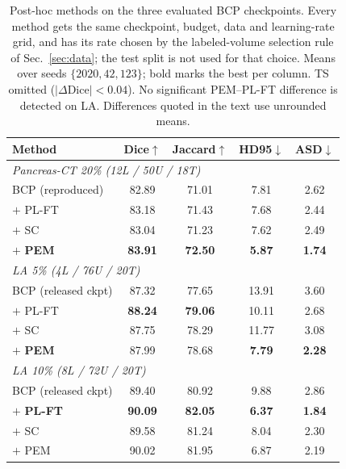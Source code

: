 \documentclass[conference]{IEEEtran}
\begin{document}
\begin{table}[tb]
\centering
\caption{Post-hoc methods on the three evaluated BCP checkpoints. Every method gets the same checkpoint, budget, data and learning-rate grid, and has its rate chosen by the labeled-volume selection rule of Sec.~\ref{sec:data}; the test split is not used for that choice. Means over seeds $\{2020,42,123\}$; bold marks the best per column. TS omitted ($|\Delta\text{Dice}|{<}0.04$). No significant PEM--PL-FT difference is detected on LA. Differences quoted in the text use unrounded means.}
\label{tab:main}
\scriptsize
\renewcommand{\arraystretch}{0.86}
\setlength{\tabcolsep}{3.5pt}
\begin{tabular}{lcccc}
\toprule
\textbf{Method} & \textbf{Dice}$\uparrow$ & \textbf{Jaccard}$\uparrow$ & \textbf{HD95}$\downarrow$ & \textbf{ASD}$\downarrow$ \\
\midrule
\multicolumn{5}{l}{\textit{Pancreas-CT 20\% \; (12L / 50U / 18T)}} \\
BCP (reproduced)             & 82.89 & 71.01 &  7.81 & 2.62 \\
\quad$+$ PL-FT               & 83.18 & 71.43 &  7.68 & 2.44 \\
\quad$+$ SC                  & 83.04 & 71.23 &  7.62 & 2.49 \\
\quad$+$ \textbf{PEM}        & \textbf{83.91} & \textbf{72.50} & \textbf{5.87} & \textbf{1.74} \\
\midrule
\multicolumn{5}{l}{\textit{LA 5\% \; (4L / 76U / 20T)}} \\
BCP (released ckpt)          & 87.32 & 77.65 & 13.91 & 3.60 \\
\quad$+$ PL-FT               & \textbf{88.24} & \textbf{79.06} & 10.11 & 2.68 \\
\quad$+$ SC                  & 87.75 & 78.29 & 11.77 & 3.08 \\
\quad$+$ \textbf{PEM}        & 87.99 & 78.68 & \textbf{7.79} & \textbf{2.28} \\
\midrule
\multicolumn{5}{l}{\textit{LA 10\% \; (8L / 72U / 20T)}} \\
BCP (released ckpt)          & 89.40 & 80.92 &  9.88 & 2.86 \\
\quad$+$ \textbf{PL-FT}      & \textbf{90.09} & \textbf{82.05} & \textbf{6.37} & \textbf{1.84} \\
\quad$+$ SC                  & 89.58 & 81.24 &  8.04 & 2.30 \\
\quad$+$ PEM                 & 90.02 & 81.95 &  6.87 & 2.19 \\
\bottomrule
\end{tabular}
\end{table}
\end{document}
